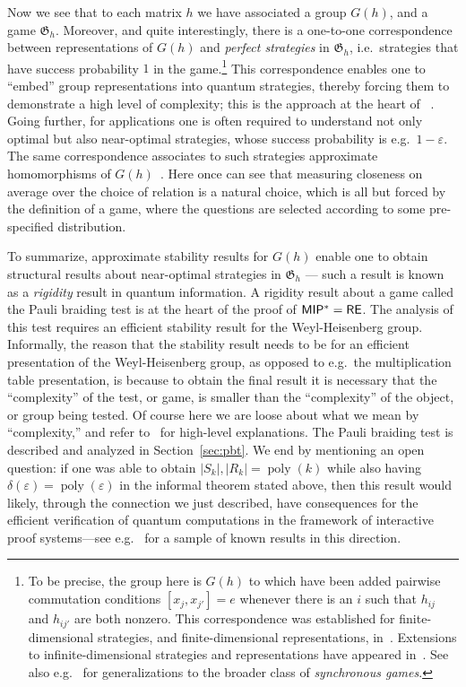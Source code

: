 \documentclass[11pt]{article}
\theoremstyle{definition}
\DeclareMathOperator{\poly}{poly}
\newcommand{\eps}{\varepsilon}
\newcommand{\game}{\mathfrak{G}}
\begin{document}
Now we see that to each matrix $h$ we have associated a group $G(h)$, and a game $\game_h$. Moreover, and quite interestingly, there is a one-to-one correspondence between representations of $G(h)$ and \emph{perfect strategies} in $\game_h$, i.e.\ strategies that have success probability $1$ in the game.\footnote{To be precise, the group here is $G(h)$ to which have been added pairwise commutation conditions $[x_j,x_{j'}]=e$ whenever there is an $i$ such that $h_{ij}$ and $h_{ij'}$ are both nonzero. This correspondence was established for finite-dimensional strategies, and finite-dimensional representations, in~\cite{cleve2014characterization}. Extensions to infinite-dimensional strategies and representations have appeared in~\cite{cleve2017perfect}. See also e.g.~\cite{kim2018synchronous} for generalizations to the broader class of \emph{synchronous games}.}
This correspondence enables one to ``embed'' group representations into quantum strategies, thereby forcing them to demonstrate a high level of complexity; this is the approach at the heart of~\cite{kim2018synchronous} . Going further, for applications one is often required to understand not only optimal but also near-optimal strategies, whose success probability is e.g.\ $1-\eps$. The same correspondence associates to such strategies approximate homomorphisms of $G(h)$~\cite{slofstra2018entanglement}. Here once can see that measuring closeness on average over the choice of relation is a natural choice, which is all but forced by the definition of a game, where the questions are selected according to some pre-specified distribution. 

To summarize, approximate stability results for $G(h)$ enable one to obtain structural results about near-optimal strategies in $\game_h$ --- such a result is known as a \emph{rigidity} result in quantum information. A rigidity result about a game called the Pauli braiding test is at the heart of the proof of $\sf MIP^* = \sf RE$. The analysis of this test requires an efficient stability result for the Weyl-Heisenberg group. Informally, the reason that the stability result needs to be for an efficient presentation of the Weyl-Heisenberg group, as opposed to e.g.\ the multiplication table presentation, is because to obtain the final result it is necessary that the ``complexity'' of the test, or game, is smaller than the ``complexity'' of the object, or group being tested. Of course here we are loose about what we mean by ``complexity,'' and refer to~\cite{ji2021mip,vidickmip} for high-level explanations. The Pauli braiding test is described and analyzed in Section~\ref{sec:pbt}. We end by mentioning an open question: if one was able to obtain $|S_k|,|R_k|=\poly(k)$ while also having $\delta(\eps)=\poly(\eps)$ in the informal theorem stated above, then this result would likely, through the connection we just described, have consequences for the efficient verification of quantum computations in the framework of interactive proof systems---see e.g.~\cite{coladangelo2019verifier,natarajan2023bounding} for a sample of known results in this direction. 
\end{document}
